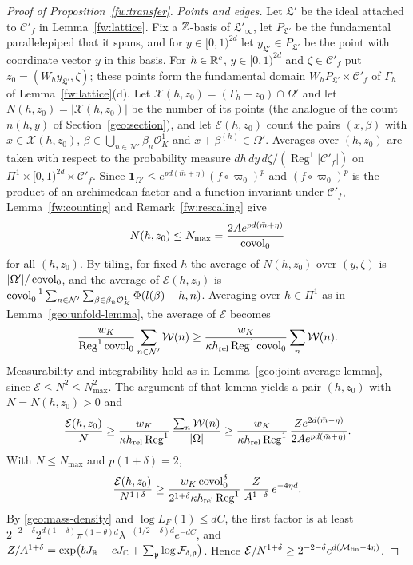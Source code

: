 \begin{proof}[Proof of Proposition~\ref{fw:transfer}]
\emph{Points and edges.} Let $\mathfrak L'$ be the ideal attached to
$\mathcal C'_f$ in Lemma~\ref{fw:lattice}. Fix a $\mathbb Z$-basis of
$\mathfrak L'_\infty$, let $P_{\mathfrak L'}$ be the fundamental
parallelepiped that it spans, and for $y\in[0,1)^{2d}$ let
$y_{\mathfrak L'}\in P_{\mathfrak L'}$ be the point with coordinate
vector $y$ in this basis. For $h\in\mathbb R^c$, $y\in[0,1)^{2d}$ and
$\zeta\in\mathcal C'_f$ put $z_0=(W_hy_{\mathfrak L'},\zeta)$; these
points form the fundamental domain $W_hP_{\mathfrak L'}\times\mathcal
C'_f$ of $\Gamma_h$ of Lemma~\ref{fw:lattice}(d). Let
$\mathcal X(h,z_0)=(\Gamma_h+z_0)\cap\Omega'$ and let
$N(h,z_0)=|\mathcal X(h,z_0)|$ be the number of its points (the analogue
of the count $n(h,y)$ of Section~\ref{geo:section}), and let
$\mathcal E(h,z_0)$ count the pairs $(x,\beta)$ with
$x\in\mathcal X(h,z_0)$, $\beta\in\bigcup_{n\in\mathcal N'}\beta_n\mathcal
O_K^1$ and $x+\beta^{(h)}\in\Omega'$. Averages over $(h,z_0)$ are taken
with respect to the probability measure
$dh\,dy\,d\zeta/(\operatorname{Reg}^1|\mathcal C'_f|)$ on
$\Pi^1\times[0,1)^{2d}\times\mathcal C'_f$. Since
$\mathbf 1_{\Omega'}\le e^{pd(\bar m+\eta)}(f\circ\varpi_0)^p$ and
$(f\circ\varpi_0)^p$ is the product of an archimedean factor and a
function invariant under $\mathcal C'_f$, Lemma~\ref{fw:counting} and
Remark~\ref{fw:rescaling} give
\[
 N(h,z_0)\le N_{\max}=\frac{2Ae^{pd(\bar m+\eta)}}{\operatorname{covol}_0}
\]
for all $(h,z_0)$. By tiling, for fixed $h$ the average of $N(h,z_0)$
over $(y,\zeta)$ is $|\Omega'|/\operatorname{covol}_0$, and the average of
$\mathcal E(h,z_0)$ is
$\operatorname{covol}_0^{-1}\sum_{n\in\mathcal N'}\sum_{\beta\in\beta_n\mathcal O_K^1}
\Phi(l(\beta)-h,n)$. Averaging over $h\in\Pi^1$ as in
Lemma~\ref{geo:unfold-lemma}, the average of $\mathcal E$ becomes
\[
 \frac{w_K}{\operatorname{Reg}^1\operatorname{covol}_0}\sum_{n\in\mathcal N'}\mathcal W(n)
 \ge\frac{w_K}{\kappa h_{\rm rel}\operatorname{Reg}^1\operatorname{covol}_0}
 \sum_n\mathcal W(n).
\]
Measurability and integrability hold as in
Lemma~\ref{geo:joint-average-lemma}, since $\mathcal E\le N^2\le
N_{\max}^2$. The argument of that lemma yields a pair $(h,z_0)$ with
$N=N(h,z_0)>0$ and
\[
 \frac{\mathcal E(h,z_0)}N\ge\frac{w_K}{\kappa h_{\rm rel}
 \operatorname{Reg}^1}\,\frac{\sum_n\mathcal W(n)}{|\Omega|}
 \ge\frac{w_K}{\kappa h_{\rm rel}\operatorname{Reg}^1}\,
 \frac{Ze^{2d(\bar m-\eta)}}{2Ae^{pd(\bar m+\eta)}} .
\]
With $N\le N_{\max}$ and $p(1+\delta)=2$,
\[
 \frac{\mathcal E(h,z_0)}{N^{1+\delta}}\ge
 \frac{w_K\operatorname{covol}_0^\delta}{2^{1+\delta}\kappa h_{\rm rel}
 \operatorname{Reg}^1}\,\frac{Z}{A^{1+\delta}}\,e^{-4\eta d}.
\]
By \eqref{geo:mass-density} and $\log L_F(1)\le dC$, the first factor
is at least
$2^{-2-\delta}2^{d(1-\delta)}\pi^{(1-\theta)d}\lambda^{-(1/2-\delta)d}e^{-dC}$,
and $Z/A^{1+\delta}=\exp\bigl(bJ_\mathbb R+cJ_\mathbb C+\sum_{\mathfrak p}\log\mathcal
F_{\delta,\mathfrak p}\bigr)$. Hence
$\mathcal E/N^{1+\delta}\ge2^{-2-\delta}e^{d(\mathcal M_{\rm
fin}-4\eta)}$.


\end{proof}
